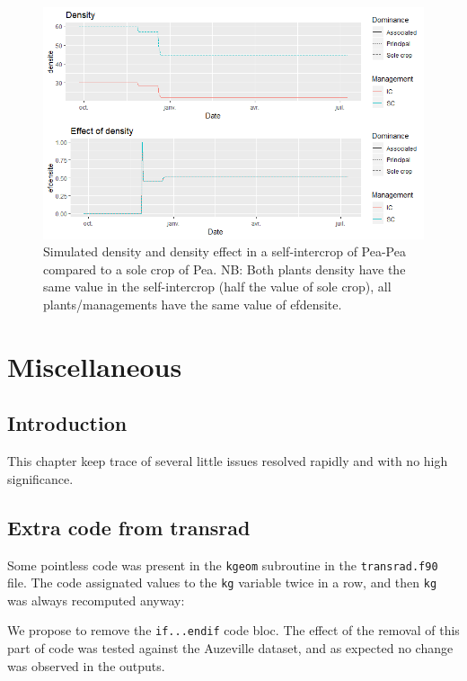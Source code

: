 \documentclass[]{book}
\begin{document}
\begin{figure}
\centering
\includegraphics{img/efdensite.png}
\caption{\label{fig:efdensite}Simulated density and density effect in a self-intercrop of Pea-Pea compared to a sole crop of Pea. NB: Both plants density have the same value in the self-intercrop (half the value of sole crop), all plants/managements have the same value of efdensite.}
\end{figure}

\hypertarget{misc}{%
\chapter{Miscellaneous}\label{misc}}

\hypertarget{introduction-10}{%
\section{Introduction}\label{introduction-10}}

This chapter keep trace of several little issues resolved rapidly and with no high significance.

\hypertarget{extra-code-from-transrad}{%
\section{Extra code from transrad}\label{extra-code-from-transrad}}

Some pointless code was present in the \texttt{kgeom} subroutine in the \texttt{transrad.f90} file. The code assignated values to the \texttt{kg} variable twice in a row, and then \texttt{kg} was always recomputed anyway:

We propose to remove the \texttt{if...endif} code bloc. The effect of the removal of this part of code was tested against the Auzeville dataset, and as expected no change was observed in the outputs.
\end{document}
